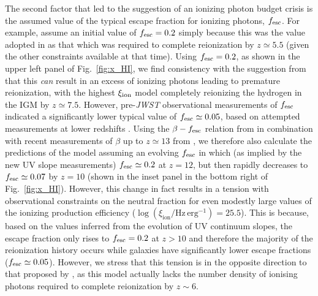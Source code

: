 \documentclass[fleqn,usenatbib]{mnras}
\begin{document}
The second factor that led to the suggestion of an ionizing photon budget crisis is the assumed value of the typical escape fraction for ionizing photons, $f_{\rm esc}$. For example,  \citet{munoz2024} assume an initial value of $f_{\rm esc}=0.2$ simply because this was the value adopted in \citet{robertson2015} as that which was required to complete reionization by $z\simeq5.5$ (given the other constraints available at that time). Using $f_{\rm esc}=0.2$, as shown in the upper left panel of Fig.~\ref{fig:x_HI}, we find consistency with the suggestion from \citet{munoz2024} that this {\it can} result in an excess of ionizing photons leading to premature reionization, with the highest $\xi_{\rm ion}$ model completely reionizing the hydrogen in the IGM by $z\simeq7.5$. However, pre-\textit{JWST} observational measurements of $f_{\rm esc}$ indicated a significantly lower typical value of $f_{\rm esc}\simeq0.05$, based on attempted measurements at lower redshifts  \citep{pahl2021,saldanalopez2022,begley2022}. Using the $\beta - f_{\rm esc}$ relation from \citet{chisholm2022} in combination with recent measurements of $\beta$ up to $z\simeq13$ from \citet{cullen2023}, we therefore also calculate the predictions of the model assuming an evolving $f_{\rm esc}$ in which (as implied by the new UV slope measurements) $f_{\rm esc}\simeq0.2$ at $z=12$, but then rapidly decreases to $f_{\rm esc}\simeq0.07$ by $z=10$ (shown in the inset panel in the bottom right of Fig.~\ref{fig:x_HI}). However, this change in fact results in a tension with observational constraints on the neutral fraction for even modestly large values of the ionizing production efficiency ($\log(\xi_{\mathrm{ion}}/ \mathrm{Hz\, erg^{-1}})=25.5$). This is because, based on the values inferred from the evolution of UV continuum slopes, the escape fraction only rises to $f_{\rm esc}=0.2$ at $z>10$ and therefore the majority of the reionization history occurs while galaxies have significantly lower escape fractions ($f_{\rm esc}\simeq0.05$). However, we stress that this tension is in the opposite direction to that proposed by \citet{munoz2024}, as this model actually lacks the number density of ionising photons required to complete reionization by $z\sim6$.
\end{document}
